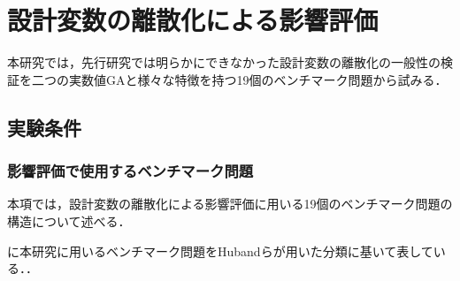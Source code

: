\documentclass[../main/main]{subfiles}
\begin{document}
\chapter{設計変数の離散化による影響評価}
本研究では，先行研究では明らかにできなかった設計変数の離散化の一般性の検証を二つの実数値GAと様々な特徴を持つ19個のベンチマーク問題から試みる．

\section{実験条件}
\subsection{影響評価で使用するベンチマーク問題}
本項では，設計変数の離散化による影響評価に用いる19個のベンチマーク問題の構造について述べる．

に本研究に用いるベンチマーク問題をHubandらが用いた分類\cite{Huband2006AReview}に基いて表している．．
\end{document}
